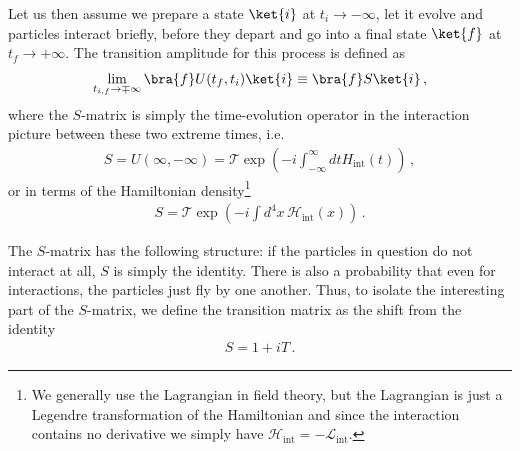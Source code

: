 Let us then assume we prepare a state $\ket{i}$ at $t_i\rightarrow -\infty$, let it evolve and particles interact briefly, before they depart and go into a final state $\ket{f}$ at $t_f\rightarrow +\infty$. The transition amplitude for this process is defined as
\begin{align}
    \lim_{t_{i,f}\rightarrow\mp\infty}\bra{f}U(t_f,t_i)\ket{i}\equiv \bra{f}S\ket{i}\,,
\end{align}
where the $S$-matrix is simply the time-evolution operator in the interaction picture between these two extreme times, i.e.
\begin{align}
    S=U(\infty,-\infty)=\mathcal{T}\exp(-i\int_{-\infty}^{\infty}dt H_{\text{int}}(t))\,,
\end{align}
or in terms of the Hamiltonian density\footnote{We generally use the Lagrangian in field theory, but the Lagrangian is just a Legendre transformation of the Hamiltonian and since the interaction contains no derivative we simply have $\mathcal{H}_{\text{int}}=-\mathcal{L}_{\text{int}}$. }
\begin{align}
    S=\mathcal{T}\exp(-i\int d^{4}x \,\mathcal{H}_{\text{int}}(x))\,.
\end{align}

The $S$-matrix has the following structure: if the particles in question do not interact at all, $S$ is simply the identity. There is also a probability that even for interactions, the particles just fly by one another. Thus, to isolate the interesting part of the $S$-matrix, we define the transition matrix as the shift from the identity
\begin{align}
    S=1+iT\,.
\end{align}

